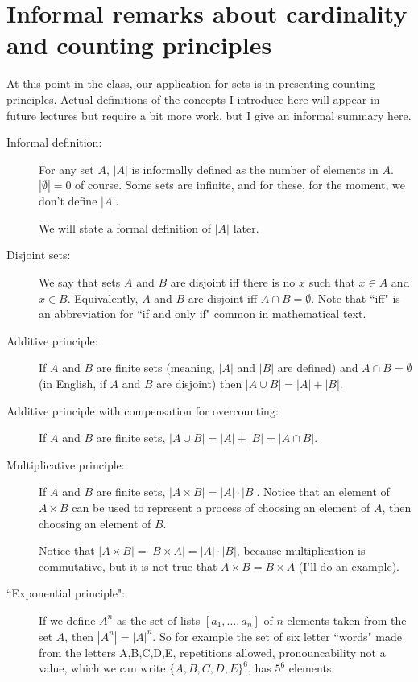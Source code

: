 \documentclass[12pt]{article}
\begin{document}
\newpage

\section{Informal remarks about cardinality and counting principles}

At this point in the class, our application for sets is in presenting counting principles.  Actual definitions of the concepts I introduce here will appear in future lectures but require a bit more work, but I give an informal summary here.

\begin{description}

\item[Informal definition:]  For any set $A$, $|A|$ is informally defined as the number of elements in $A$.
$|\emptyset|=0$ of course.  Some sets are infinite, and for these, for the moment, we don't define $|A|$.

We will state a formal definition of $|A|$ later.

\item[Disjoint sets:]  We say that sets $A$ and $B$ are disjoint iff there is no $x$ such that $x \in A$ and $x \in B$.
Equivalently, $A$ and $B$ are disjoint iff $A \cap B = \emptyset$.  Note that ``iff" is an abbreviation for ``if and only if" common in mathematical text.

\item[Additive principle:]   If $A$ and $B$ are finite sets (meaning, $|A|$ and $|B|$ are defined) and $A \cap B = \emptyset$ (in English, if $A$ and $B$ are disjoint) then $|A \cup B| = |A| + |B|$.

\item[Additive principle with compensation for overcounting:]  If $A$ and $B$ are finite sets,
$|A \cup B| = |A| + |B| = |A\cap B|$.

\item[Multiplicative principle:]  If $A$ and $B$ are finite sets, $|A \times B| = |A|\cdot |B|$.  Notice that
an element of $A \times B$ can be used to represent a process of choosing an element of $A$, then choosing an element of $B$.

Notice that $|A \times B| = |B \times A| = |A|\cdot |B|$, because multiplication is commutative, but it is not true
that $A \times B = B \times A$ (I'll do an example).

\item[``Exponential principle":]  If we define $A^n$ as the set of lists $[a_1,\ldots,a_n]$ of $n$ elements taken from the set $A$, then $|A^n| = |A|^n$.  So for example the set of six letter ``words" made from the letters A,B,C,D,E, repetitions allowed, pronouncability not a value, which we can write $\{A,B,C,D,E\}^6$, has $5^6$ elements.


\end{description}
\end{document}
